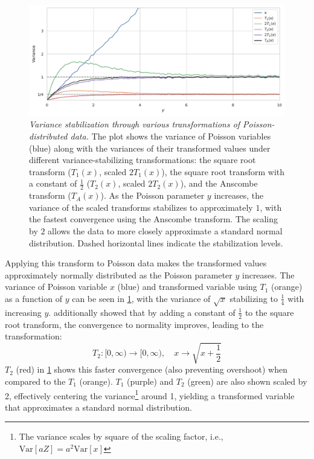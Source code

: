 \begin{figure}
    \centering
    \includegraphics[width=1\linewidth]{images/data_transform_anscombe.pdf}
    \caption{\textit{Variance stabilization through various transformations of Poisson-distributed data.} The plot shows the variance of Poisson variables (blue) along with the variances of their transformed values under different variance-stabilizing transformations: the square root transform ($T_1(x)$, scaled $2T_1(x)$), the square root transform with a constant of $\frac{1}{2}$ ($T_2(x)$, scaled $2T_2(x)$), and the Anscombe transform ($T_A(x)$). 
    As the Poisson parameter $y$ increases, the variance of the scaled transforms stabilizes to approximately $1$, with the fastest convergence using the Anscombe transform.
    The scaling by $2$ allows the data to more closely approximate a standard normal distribution. Dashed horizontal lines indicate the stabilization levels.}
    \label{fig:data-transform-anscombe}
\end{figure}

Applying this transform to Poisson data makes the transformed values approximately normally distributed as the Poisson parameter $y$ increases. The variance of Poisson variable $x$ (blue) and transformed variable using $T_1$ (orange) as a function of $y$ can be seen in \cref{fig:data-transform-anscombe}, with the variance of $\sqrt{x}$ stabilizing to $\frac{1}{4}$ with increasing $y$. \citeauthor{bartlettSquareRootTransformation1936} additionally showed that by adding a constant of $\frac{1}{2}$ to the square root transform, the convergence to normality improves, leading to the transformation:
\begin{equation}
    T_2: [0, \infty) \to [0, \infty), \quad x \to \sqrt{x + \frac{1}{2}}
\end{equation}
$T_2$ (red) in \cref{fig:data-transform-anscombe} shows this faster convergence (also preventing overshoot) when compared to the $T_1$ (orange). $T_1$ (purple) and $T_2$ (green) are also shown scaled by \num{2}, effectively centering the variance\footnote{The variance scales by square of the scaling factor, i.e., $\text{Var}[aZ] = a^2 \text{Var}[x]$} around \num{1}, yielding a transformed variable that approximates a standard normal distribution.

